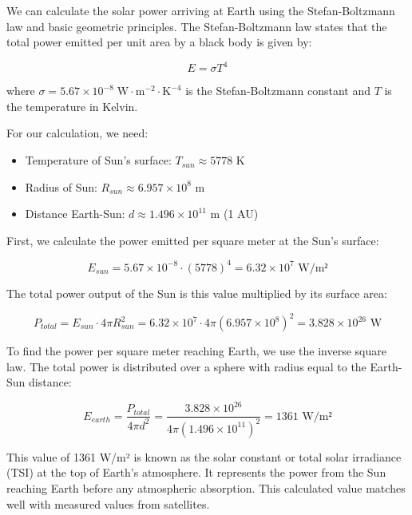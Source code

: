 \documentclass[
  a4paper,
]{book}
\providecommand{\tightlist}{%
  \setlength{\itemsep}{0pt}\setlength{\parskip}{0pt}}
\begin{document}
\begin{tcolorbox}[enhanced jigsaw, coltitle=black, title=\textcolor{quarto-callout-tip-color}{\faLightbulb}\hspace{0.5em}{Solar Power at Earth's Distance: A Stefan-Boltzmann Law Calculation}, colframe=quarto-callout-tip-color-frame, toprule=.15mm, opacitybacktitle=0.6, left=2mm, opacityback=0, breakable, toptitle=1mm, bottomtitle=1mm, leftrule=.75mm, arc=.35mm, titlerule=0mm, colbacktitle=quarto-callout-tip-color!10!white, rightrule=.15mm, bottomrule=.15mm, colback=white]

We can calculate the solar power arriving at Earth using the
Stefan-Boltzmann law and basic geometric principles. The
Stefan-Boltzmann law states that the total power emitted per unit area
by a black body is given by:

\[E = \sigma T^4\]

where
\(\sigma = 5.67 \times 10^{-8} \; \mathrm{W} \cdot \mathrm{m}^{-2} \cdot \mathrm{K}^{-4}\)
is the Stefan-Boltzmann constant and \(T\) is the temperature in Kelvin.

For our calculation, we need:

\begin{itemize}
\tightlist
\item
  Temperature of Sun's surface: \(T_{sun} \approx 5778\) K
\item
  Radius of Sun: \(R_{sun} \approx 6.957 \times 10^8\) m
\item
  Distance Earth-Sun: \(d \approx 1.496 \times 10^{11}\) m (1 AU)
\end{itemize}

First, we calculate the power emitted per square meter at the Sun's
surface:

\[E_{sun} = 5.67 \times 10^{-8} \cdot (5778)^4 = 6.32 \times 10^7 \text{ W/m²}\]

The total power output of the Sun is this value multiplied by its
surface area:

\[P_{total} = E_{sun} \cdot 4\pi R_{sun}^2 = 6.32 \times 10^7 \cdot 4\pi (6.957 \times 10^8)^2 = 3.828 \times 10^{26} \text{ W}\]

To find the power per square meter reaching Earth, we use the inverse
square law. The total power is distributed over a sphere with radius
equal to the Earth-Sun distance:

\[E_{earth} = \frac{P_{total}}{4\pi d^2} = \frac{3.828 \times 10^{26}}{4\pi (1.496 \times 10^{11})^2} = 1361 \text{ W/m²}\]

This value of 1361 W/m² is known as the solar constant or total solar
irradiance (TSI) at the top of Earth's atmosphere. It represents the
power from the Sun reaching Earth before any atmospheric absorption.
This calculated value matches well with measured values from satellites.

\end{tcolorbox}
\end{document}
